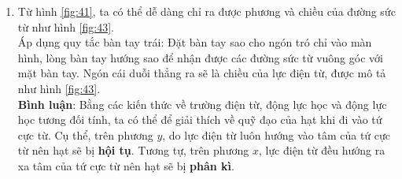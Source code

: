 \begin{enumerate}
    \item
    Từ hình \ref{fig:41}, ta có thể dễ dàng chỉ ra được phương và chiều của đường sức từ như hình \ref{fig:43}. \\

    Áp dụng quy tắc bàn tay trái: Đặt bàn tay sao cho ngón tró chỉ vào màn hình, lòng bàn tay hướng sao để nhận được các đường sức từ vuông góc với mặt bàn tay. Ngón cái duỗi thẳng ra sẽ là chiều của lực điện từ, được mô tả như hình \ref{fig:43}. \\

    \textbf{Bình luận}: Bằng các kiến thức về trường điện từ, động lực học và động lực học tương đối tính, ta có thể  để giải thích về quỹ đạo của hạt khi đi vào tứ cực từ. Cụ thể, trên phương $y$, do lực điện từ luôn hướng vào tâm của tứ cực từ nên hạt sẽ bị \textbf{hội tụ}. Tương tự, trên phương $x$, lực điện từ đều hướng ra xa tâm của tứ cực từ nên hạt sẽ bị \textbf{phân kì}. 
    
    \begin{figure}[!ht]
    \centering
    \scalebox{0.82}{
    \begin{tikzpicture}[x=0.75pt,y=0.75pt,yscale=-1,xscale=1]
        

\end{tikzpicture}}
\end{figure}
\end{enumerate}
